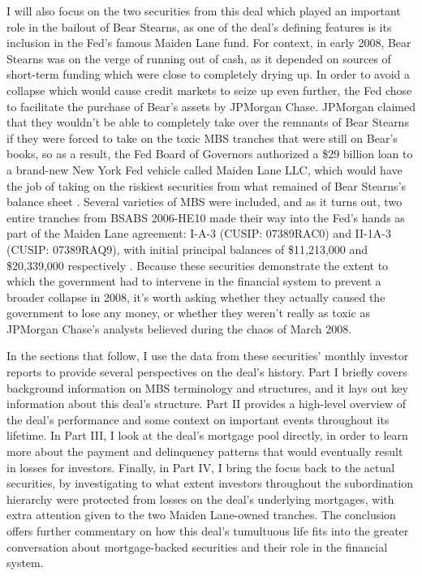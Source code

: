 \documentclass[12pt]{article}
\begin{document}
I will also focus on the two securities from this deal which played an important role in the bailout of Bear Stearns, as one of the deal's defining features is its inclusion in the Fed’s famous Maiden Lane fund. For context, in early 2008, Bear Stearns was on the verge of running out of cash, as it depended on sources of short-term funding which were close to completely drying up. In order to avoid a collapse which would cause credit markets to seize up even further, the Fed chose to facilitate the purchase of Bear’s assets by JPMorgan Chase. JPMorgan claimed that they wouldn’t be able to completely take over the remnants of Bear Stearns if they were forced to take on the toxic MBS tranches that were still on Bear’s books, so as a result, the Fed Board of Governors authorized a \$29 billion loan to a brand-new New York Fed vehicle called Maiden Lane LLC, which would have the job of taking on the riskiest securities from what remained of Bear Stearns’s balance sheet \parencite{fcic09}. Several varieties of MBS were included, and as it turns out, two entire tranches from BSABS 2006-HE10 made their way into the Fed’s hands as part of the Maiden Lane agreement: I-A-3 (CUSIP: 07389RAC0) and II-1A-3 (CUSIP: 07389RAQ9), with initial principal balances of \$11,213,000 and \$20,339,000 respectively \parencite{fcic09}. Because these securities demonstrate the extent to which the government had to intervene in the financial system to prevent a broader collapse in 2008, it’s worth asking whether they actually caused the government to lose any money, or whether they weren’t really as toxic as JPMorgan Chase’s analysts believed during the chaos of March 2008.

In the sections that follow, I use the data from these securities' monthly investor reports to provide several perspectives on the deal’s history. Part I briefly covers background information on MBS terminology and structures, and it lays out key information about this deal’s structure. Part II provides a high-level overview of the deal’s performance and some context on important events throughout its lifetime. In Part III, I look at the deal’s mortgage pool directly, in order to learn more about the payment and delinquency patterns that would eventually result in losses for investors. Finally, in Part IV, I bring the focus back to the actual securities, by investigating to what extent investors throughout the subordination hierarchy were protected from losses on the deal’s underlying mortgages, with extra attention given to the two Maiden Lane-owned tranches. The conclusion offers further commentary on how this deal’s tumultuous life fits into the greater conversation about mortgage-backed securities and their role in the financial system.
\end{document}
